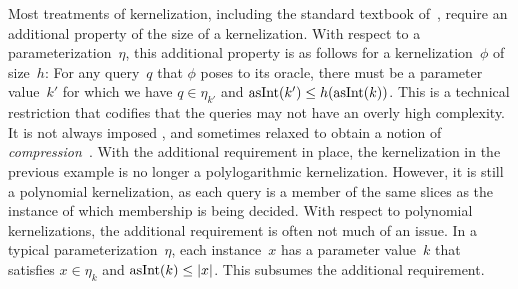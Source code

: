Most treatments of kernelization, including the standard textbook of~\textcite{fomin2019kernelization}, require an additional property of the size of a kernelization.
With respect to a parameterization~$\eta$, this additional property is as follows for a kernelization~$\phi$ of size~$h$:
For any query~$q$ that $\phi$ poses to its oracle, there must be a parameter value~$k'$ for which we have $q \in \eta_{k'}$ and $\operatorname{asInt}(k') \le h(\operatorname{asInt}(k))$.
This is a technical restriction that codifies that the queries may not have an overly high complexity.
It is not always imposed \parencite[e.g.][]{flum2006parameterized}, and sometimes relaxed to obtain a notion of \emph{compression}~\parencite{bodlaender2014kernelization}.
With the additional requirement in place, the kernelization in the previous example is no longer a polylogarithmic kernelization.
However, it is still a polynomial kernelization, as each query is a member of the same slices as the instance of which membership is being decided.
With respect to polynomial kernelizations, the additional requirement is often not much of an issue.
In a typical parameterization~$\eta$, each instance~$x$ has a parameter value~$k$ that satisfies $x \in \eta_k$ and $\operatorname{asInt}(k) \le {\lvert x\rvert}$.
This subsumes the additional requirement.

